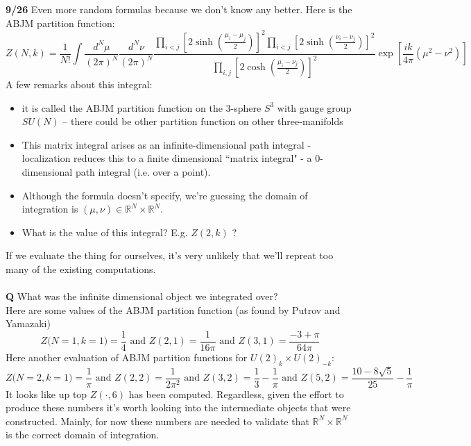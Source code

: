 \documentclass[12pt]{article}
\begin{document}
\noindent \textbf{9/26} Even more random formulas because we don't know any better.  Here is the ABJM partition function:
$$ Z(N,k) = \frac{1}{N!} \int \frac{d^N \mu}{(2\pi)^N} \frac{d^N \nu}{(2\pi)^N} 
\frac{
\prod_{i < j} \left[ 2\sinh \left( \frac{\mu_i - \mu_j}{2} \right)\right]^2 
\prod_{i < j} \left[ 2\sinh \left( \frac{\nu_i - \nu_j}{2} \right)\right]^2 }{ 
\prod_{i,j  } \left[ 2\cosh \left( \frac{\mu_i - \nu_j}{2} \right)\right]^2 } \exp \left[ \frac{ik}{4\pi} (\mu^2 - \nu^2) \right]  $$
A few remarks about this integral:
\begin{itemize}
\item it is called the ABJM partition function on the 3-sphere $S^3$ with gauge group $SU(N)$ -- there could be other partition function on other three-manifolds
\item This matrix integral arises as an infinite-dimensional path integral - localization reduces this to a finite dimensional ``matrix integral" - a 0-dimensional path integral (i.e. over a point). 
\item Although the formula doesn't specify, we're guessing the domain of integration is $(\mu, \nu) \in \mathbb{R}^N \times \mathbb{R}^N$.
\item What is the value of this integral?  E.g. $Z(2,k)$ ?
\end{itemize}
If we evaluate the thing for ourselves, it's very unlikely that we'll repreat too many of the existing computations. \\ \\
\textbf{Q} What was the infinite dimensional object we integrated over? \\ 

\noindent Here are some values of the ABJM partition function (as found by Putrov and  Yamazaki)
$$ Z \Big( N=1 , k=1 \Big) = \frac{1}{4} \text{ and } Z(2,1) = \frac{1}{16\pi}
\text{ and } Z(3,1) = \frac{-3+\pi}{64\pi}$$
Here another evaluation of ABJM partition functions for $U(2)_k \times U(2)_{-k}$:
$$ Z\Big(N=2,k=1\Big) = \frac{1}{\pi} \text{ and }Z(2,2) = \frac{1}{2\pi^2} 
\text{ and }Z(3,2) = \frac{1}{3}-\frac{1}{\pi}
\text{ and }Z(5,2) = \frac{10 - 8 \sqrt{5}}{25} - \frac{1}{\pi}$$
It looks like up top $Z(\cdot, 6)$ has been computed.  Regardless, given the effort to produce these numbers it's worth looking into the intermediate objects that were constructed.  Mainly, for now these numbers are needed to validate that $\mathbb{R}^N \times \mathbb{R}^N$ is the correct domain of integration.
\vfill
\end{document}
